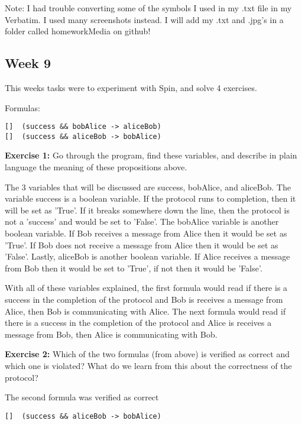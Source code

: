 \documentclass{article}
\theoremstyle{theorem}
\theoremstyle{definition}
\theoremstyle{remark}
\begin{document}
\noindent Note: I had trouble converting some of the symbols I used in my .txt file in my Verbatim. I used many screenshots instead. I will add my .txt and .jpg's in a folder called homeworkMedia on github!


\subsection{Week 9}
This weeks tasks were to experiment with Spin, and solve 4 exercises.

\noindent\newline Formulas:
\begin{verbatim}
[]  (success && bobAlice -> aliceBob)
[]  (success && aliceBob -> bobAlice)
\end{verbatim}


\noindent\newline\textbf{Exercise 1:} 
Go through the program, find these variables, and describe in plain language the meaning of these propositions above.

\noindent\newline The 3 variables that will be discussed are success, bobAlice, and aliceBob. The variable success is a boolean variable. If the protocol runs to completion, then it will be set as 'True'. If it breaks somewhere down the line, then the protocol is not a 'success' and would be set to 'False'. The bobAlice variable is another boolean variable. If Bob receives a message from Alice then it would be set as 'True'. If Bob does not receive a message from Alice then it would be set as 'False'. Lastly, aliceBob is another boolean variable. If Alice receives a message from Bob then it would be set to 'True', if not then it would be 'False'.

\noindent\newline With all of these variables explained, the first formula would read if there is a success in the completion of the protocol and Bob is receives a message from Alice, then Bob is communicating with Alice. The next formula would read if there is a success in the completion of the protocol and Alice is receives a message from Bob, then Alice is communicating with Bob.


\noindent\newline\textbf{Exercise 2:} 
Which of the two formulas (from above) is verified as correct and which one is violated? What do we learn from this about the correctness of the protocol?

The second formula was verified as correct
\begin{verbatim}
[]  (success && aliceBob -> bobAlice)
\end{verbatim}
\end{document}
